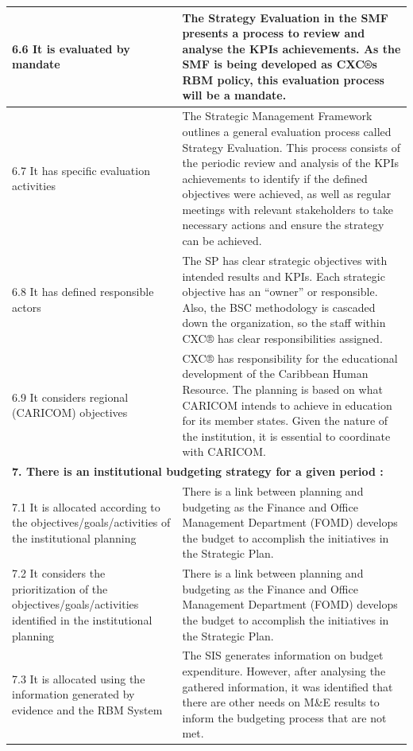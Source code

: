 \documentclass[
  10pt,
]{book}
\begin{document}
\begin{table}
\begin{tabular}[t]{l|l}
\hline
\hspace{1em}6.6 It is evaluated by mandate & The Strategy Evaluation in the SMF presents a process to review and analyse the KPIs achievements. As the SMF is being developed as CXC®s RBM policy, this evaluation process will be a mandate.\\
\hline
\hspace{1em}6.7 It has specific evaluation activities & The Strategic Management Framework outlines a general evaluation process called Strategy Evaluation. This process consists of the periodic review and analysis of the KPIs achievements to identify if the defined objectives were achieved, as well as regular meetings with relevant stakeholders to take necessary actions and ensure the strategy can be achieved.\\
\hline
\hspace{1em}6.8 It has defined responsible actors & The SP has clear strategic objectives with intended results and KPIs. Each strategic objective has an “owner” or responsible. Also, the BSC methodology is cascaded down the organization, so the staff within CXC® has clear responsibilities assigned.\\
\hline
\hspace{1em}6.9 It considers regional (CARICOM) objectives & CXC® has responsibility for the educational development of the Caribbean Human Resource. The planning is based on what CARICOM intends to achieve in education for its member states. Given the nature of the institution, it is essential to coordinate with CARICOM.\\
\hline
\multicolumn{2}{l}{\textbf{7. There is an institutional budgeting strategy for a given period :}}\\
\hline
\hspace{1em}7.1 It is allocated according to the objectives/goals/activities of the institutional planning & There is a link between planning and budgeting as the Finance and Office Management Department (FOMD) develops the budget to accomplish the initiatives in the Strategic Plan.\\
\hline
\hspace{1em}7.2 It considers the prioritization of the objectives/goals/activities identified in the institutional planning & There is a link between planning and budgeting as the Finance and Office Management Department (FOMD) develops the budget to accomplish the initiatives in the Strategic Plan.\\
\hline
\hspace{1em}7.3 It is allocated using the information generated by evidence and the RBM System & The SIS generates information on budget expenditure. However, after analysing the gathered information, it was identified that there are other needs on M\&E results to inform the budgeting process that are not met.\\

\end{tabular}
\end{table}
\end{document}
